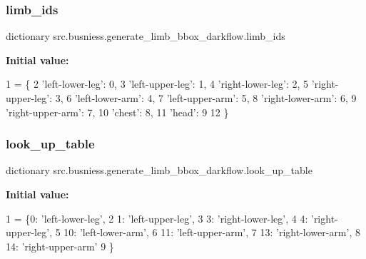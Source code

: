 \subsubsection{\texorpdfstring{limb\+\_\+ids}{limb\_ids}}
{\footnotesize\ttfamily dictionary src.\+busniess.\+generate\+\_\+limb\+\_\+bbox\+\_\+darkflow.\+limb\+\_\+ids}

{\bfseries Initial value\+:}
\begin{DoxyCode}
1 =  \{
2     \textcolor{stringliteral}{'left-lower-leg'}: 0,
3     \textcolor{stringliteral}{'left-upper-leg'}: 1,
4     \textcolor{stringliteral}{'right-lower-leg'}: 2,
5     \textcolor{stringliteral}{'right-upper-leg'}: 3,
6     \textcolor{stringliteral}{'left-lower-arm'}: 4,
7     \textcolor{stringliteral}{'left-upper-arm'}: 5,
8     \textcolor{stringliteral}{'right-lower-arm'}: 6,
9     \textcolor{stringliteral}{'right-upper-arm'}: 7,
10     \textcolor{stringliteral}{'chest'}: 8,
11     \textcolor{stringliteral}{'head'}: 9
12 \}
\end{DoxyCode}
\mbox{\label{namespacesrc_1_1busniess_1_1generate__limb__bbox__darkflow_a06e652953c22965788f70bcea0117009}} 
\subsubsection{\texorpdfstring{look\+\_\+up\+\_\+table}{look\_up\_table}}
{\footnotesize\ttfamily dictionary src.\+busniess.\+generate\+\_\+limb\+\_\+bbox\+\_\+darkflow.\+look\+\_\+up\+\_\+table}

{\bfseries Initial value\+:}
\begin{DoxyCode}
1 =  \{0: \textcolor{stringliteral}{'left-lower-leg'},
2                  1: \textcolor{stringliteral}{'left-upper-leg'},
3                  3: \textcolor{stringliteral}{'right-lower-leg'},
4                  4: \textcolor{stringliteral}{'right-upper-leg'},
5                  10: \textcolor{stringliteral}{'left-lower-arm'},
6                  11: \textcolor{stringliteral}{'left-upper-arm'},
7                  13: \textcolor{stringliteral}{'right-lower-arm'},
8                  14: \textcolor{stringliteral}{'right-upper-arm'}
9                  \}
\end{DoxyCode}
\mbox{\label{namespacesrc_1_1busniess_1_1generate__limb__bbox__darkflow_a7f8ea5a0eecabd051f09dcd825023962}} 
